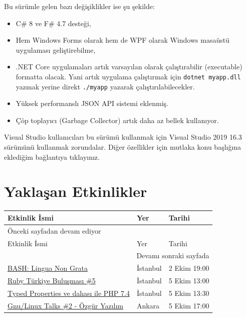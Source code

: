 \documentclass[11pt]{article}
\begin{document}
Bu sürümle gelen bazı değişiklikler ise şu şekilde:
\begin{itemize}
\item C\# 8 ve F\# 4.7 desteği,
\item Hem Windows Forms olarak hem de WPF olarak Windows masaüstü uygulaması
geliştirebilme,
\item .NET Core uygulamaları artık varsayılan olarak çalıştırabilir (executable)
formatta olacak. Yani artık uygulama çalıştırmak için \texttt{dotnet myapp.dll}
yazmak yerine direkt \texttt{./myapp} yazarak çalıştırılabilecekler.
\item Yüksek performanslı JSON API sistemi eklenmiş.
\item Çöp toplayıcı (Garbage Collector) artık daha az bellek kullanıyor.
\end{itemize}

Visual Studio kullanıcıları bu sürümü kullanmak için Visual Studio 2019 16.3
sürümünü kullanmak zorundalar. Diğer özellikler için mutlaka konu başlığına
eklediğim bağlantıya tıklayınız.
\section{Yaklaşan Etkinlikler}
\label{sec:org62d6dc3}
\begin{longtable}{|p{8cm}|l|l|}
\hline
Etkinlik İsmi & Yer & Tarihi\\
\hline
\endfirsthead
\multicolumn{3}{l}{Önceki sayfadan devam ediyor} \\
\hline

Etkinlik İsmi & Yer & Tarihi \\

\hline
\endhead
\hline\multicolumn{3}{r}{Devamı sonraki sayfada} \\
\endfoot
\endlastfoot
\hline
\href{https://kommunity.com/software-craftsmanship-turkey/events/bash-lingua-non-grata}{BASH: Lingua Non Grata} & İstanbul & 2 Ekim 19:00\\
\href{https://kommunity.com/ruby-turkiye/events/ruby-turkiye-bulusmasi-5}{Ruby Türkiye Buluşması \#5} & İstanbul & 5 Ekim 13:00\\
\href{https://kommunity.com/istanbulphp/events/typed-properties-ve-dahasi-ile-php-74}{Typed Properties ve dahası ile PHP 7.4} & İstanbul & 5 Ekim 13:30\\
\href{https://kommunity.com/gnulinux-talk/events/gnulinux-talks-2-ozgur-yazilim-lisanslar}{Gnu/Linux Talks \#2 - Özgür Yazılım} & Ankara & 5 Ekim 17:00\\
\hline
\end{longtable}
\end{document}
